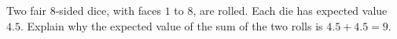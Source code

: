 Two fair $8$-sided dice, with faces $1$ to $8$, are rolled. Each die has expected value $4.5$. Explain why the expected value of the sum of the two rolls is $4.5+4.5=9$.
